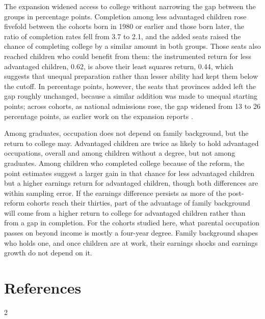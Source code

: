 \documentclass[11pt]{article}
\begin{document}
The expansion widened access to college without narrowing the gap between the groups in percentage points. Completion among less advantaged children rose fivefold between the cohorts born in 1980 or earlier and those born later, the ratio of completion rates fell from 3.7 to 2.1, and the added seats raised the chance of completing college by a similar amount in both groups. Those seats also reached children who could benefit from them: the instrumented return for less advantaged children, 0.62, is above their least squares return, 0.44, which suggests that unequal preparation rather than lesser ability had kept them below the cutoff. In percentage points, however, the seats that provinces added left the gap roughly unchanged, because a similar addition was made to unequal starting points; across cohorts, as national admissions rose, the gap widened from 13 to 26 percentage points, as earlier work on the expansion reports \citep{Yeung2013}.

Among graduates, occupation does not depend on family background, but the return to college may. Advantaged children are twice as likely to hold advantaged occupations, overall and among children without a degree, but not among graduates. Among children who completed college because of the reform, the point estimates suggest a larger gain in that chance for less advantaged children but a higher earnings return for advantaged children, though both differences are within sampling error. If the earnings difference persists as more of the post-reform cohorts reach their thirties, part of the advantage of family background will come from a higher return to college for advantaged children rather than from a gap in completion. For the cohorts studied here, what parental occupation passes on beyond income is mostly a four-year degree. Family background shapes who holds one, and once children are at work, their earnings shocks and earnings growth do not depend on it.

{\footnotesize
{}
\setlength{\bibsep}{0pt}
\setlength{\columnsep}{12pt}
\section*{References}
\renewcommand{\bibsection}{}
\raggedright
\begin{multicols}{2}

\end{multicols}}

\appendix
\normalsize{}
\renewcommand{\theequation}{A.\arabic{equation}}
\setcounter{equation}{0}
\newcommand{\resultskip}{\par\medskip}
\newcommand{\proofskip}{\par\medskip}
\newcommand{\partskip}{\par\vspace{2pt}}
\end{document}

